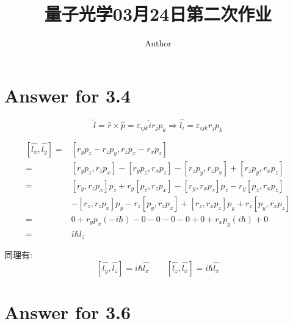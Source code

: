 \documentclass[twoside]{article}
\begin{document}
\title{量子光学03月24日第二次作业}
\author{Author}
\pagestyle{fancy}
\makeatletter
\fancyhead[L]{\@title}
\fancyhead[R]{\@author}
\makeatother
\setlength{\parindent}{0pt}

\section*{Answer for 3.4}

\begin{equation*}
    \hat{l} =\hat{r} \times \hat{p} = \varepsilon_{ijk} \hat{i} r_j p_k  \Rightarrow \hat{l_i} = \varepsilon_{ijk} r_j p_k
\end{equation*}

\begin{equation*}
    \begin{split}
        \left[\hat{l_x}, \hat{l_y}\right] = & \left[r_y p_z - r_z p_y, r_z p_x - r_x p_z\right]                                                                               \\
        =                                   & \left[r_y p_z, r_z p_x\right] - \left[r_y p_z, r_x p_z\right] - \left[r_z p_y, r_z p_x\right] + \left[r_z p_y, r_x p_z\right]   \\
        =                                   & \left[r_y, r_z p_x\right] p_z  + r_y \left[p_z, r_z p_x\right] - \left[r_y, r_x p_z\right] p_z - r_y \left[ p_z, r_x p_z\right] \\
                                            & - \left[r_z, r_z p_x\right] p_y - r_z \left[p_y, r_z p_x\right] + \left[r_z, r_x p_z\right] p_y + r_z \left[p_y, r_x p_z\right] \\
        =                                   & 0 + r_y p_x (-i\hbar) - 0 - 0 - 0 - 0 + 0 + r_x p_y (i\hbar) + 0                                                                \\
        =                                   & i\hbar l_z
    \end{split}
\end{equation*}

同理有:
\begin{equation*}
    \left[\hat{l_y}, \hat{l_z} \right] = i\hbar \hat{l_x} \qquad \left[\hat{l_z}, \hat{l_x} \right] = i\hbar \hat{l_x}
\end{equation*}

\section*{Answer for 3.6}
\end{document}

